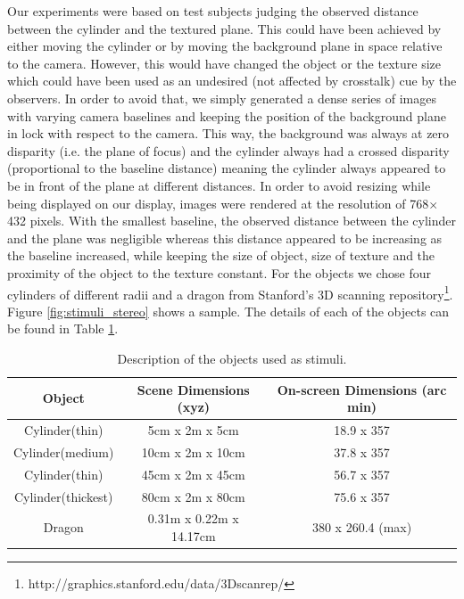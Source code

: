 Our experiments were based on test subjects judging the observed distance between the cylinder and the textured plane. This could have been achieved by either moving the cylinder or by moving the background plane in space relative to the camera. However, this would have changed the object or the texture size which could have been used as an undesired (not affected by crosstalk) cue by the observers. In order to avoid that, we simply generated a dense series of images with varying camera baselines and keeping the position of the background plane in lock with respect to the camera. This way, the background was always at zero disparity (i.e. the plane of focus) and the cylinder always had a crossed disparity (proportional to the baseline distance) meaning the cylinder always appeared to be in front of the plane at different distances. In order to avoid resizing while being displayed on our display, images were rendered at the resolution of 768$\times$432 pixels. With the smallest baseline, the observed distance between the cylinder and the plane was negligible whereas this distance appeared to be increasing as the baseline increased, while keeping the size of object, size of texture and the proximity of the object to the texture constant. For the objects we chose four cylinders of different radii and a dragon from Stanford's 3D scanning repository\footnote{http://graphics.stanford.edu/data/3Dscanrep/}. Figure \ref{fig:stimuli_stereo} shows a sample. The details of each of the objects can be found in Table \ref{tab:stimili_desc}.
\begin{table}[ht!]
  \begin{center}
    \caption{Description of the objects used as stimuli.}
    \label{tab:stimili_desc}
    \begin{tabular}{ccc}
      \toprule
      Object & Scene Dimensions (xyz) & On-screen Dimensions (arc min)\\
      \midrule
      Cylinder(thin) & 5cm x 2m x 5cm & 18.9 x 357\\
      Cylinder(medium) & 10cm x 2m x 10cm & 37.8 x 357\\
      Cylinder(thin) & 45cm x 2m x 45cm & 56.7 x 357\\
      Cylinder(thickest) & 80cm x 2m x 80cm & 75.6 x 357 \\
      Dragon & 0.31m x 0.22m x 14.17cm & 380 x 260.4 (max) \\
      \bottomrule
    \end{tabular}
  \end{center}
\end{table}

